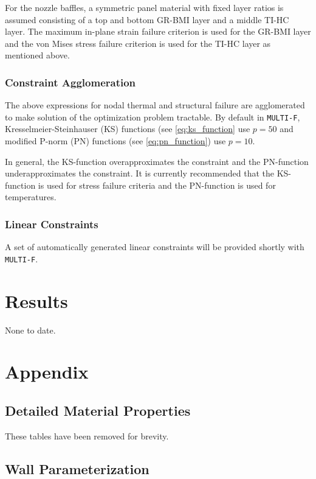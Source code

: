 \documentclass{article}
\begin{document}
For the nozzle baffles, a symmetric panel material with fixed layer ratios is assumed consisting of a top and bottom GR-BMI layer and a middle TI-HC layer. The maximum in-plane strain failure criterion is used for the GR-BMI layer and the von Mises stress failure criterion is used for the TI-HC layer as mentioned above.

\subsubsection{Constraint Agglomeration}

The above expressions for nodal thermal and structural failure are agglomerated to make solution of the optimization problem tractable. By default in \texttt{MULTI-F}, Kresselmeier-Steinhauser (KS) functions (see \ref{eq:ks_function} use $p = 50$ and modified P-norm (PN) functions (see \ref{eq:pn_function}) use $p = 10$.

In general, the KS-function overapproximates the constraint and the PN-function underapproximates the constraint. It is currently recommended that the KS-function is used for stress failure criteria and the PN-function is used for temperatures.

\subsubsection{Linear Constraints}

A set of automatically generated linear constraints will be provided shortly with \texttt{MULTI-F}.

\section{Results} \label{sec:results}

None to date.

\section{Appendix} \label{sec:appendix}

\subsection{Detailed Material Properties}

These tables have been removed for brevity.

\subsection{Wall Parameterization}
\end{document}
